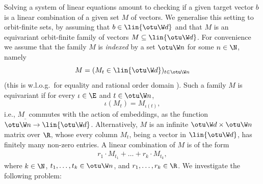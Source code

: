 Solving a system of linear equations amount to checking if a given target vector $b$ 
is a linear combination of a given set $M$ of vectors.
We generalise this setting to orbit-finite sets, by assuming that $b\in \lin{\otu \W d}$
and that $M$ is an equivariant orbit-finite family of vectors $M\subseteq\lin{\otu \W d}$.
For convenience we assume that the family $M$  
is \emph{indexed} by a set $\otu \W n$ for some $n\in\N$, 
namely 
\[
M = (M_t\in\lin{\otu \W d})_{t \in\otu \W n}
\]
(this is w.l.o.g.~for equality and rational order domain \cite[Sect.6]{GHL22}).
Such a family $M$ is equivariant if for every $\iota\in\E$ and $t\in\otu \W n$, 
\[
\iota (M_t) = M_{\iota(t)},
\]
i.e., $M_\_$ commutes with the action of embeddings, as the function
$\otu \W n \to \lin{\otu \W d}$.
Alternatively, $M$ is an infinite $\otu \W d \times \otu \W n$ matrix
over $\R$,
whose every column $M_t$, being a vector in $\lin{\otu \W d}$, 
has finitely many non-zero entries.
A linear combination of $M$ is of the form
\begin{align} \label{eq:lincomb}
r_1 \cdot M_{t_1} + \ldots + r_k \cdot M_{t_k},
\end{align}
where $k\in\N$, $t_1, \ldots, t_k \in \otu \W n$, and $r_1, \ldots, r_k\in\R$.
We investigate the following problem:

